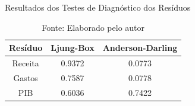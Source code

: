 \documentclass[a4paper, 12pt, openany, oneside, brazil]{abntex2}
\begin{document}
\begin{apendicesenv}
\begin{table}[h!]
	\centering
	\caption{Resultados dos Testes de Diagnóstico dos Resíduos}
	\begin{tabular}{|c|c|c|}
		\hline
		\textbf{Resíduo} & \textbf{Ljung-Box} & \textbf{Anderson-Darling} \\ \hline
		Receita & 0.9372 & 0.0773 \\ \hline
		Gastos  & 0.7587 & 0.0778 \\ \hline
		PIB     & 0.6036 & 0.7422 \\ \hline
	\end{tabular}
	\caption*{Fonte: Elaborado pelo autor}
\end{table}


\end{apendicesenv}




% 
% 
%



% 




\end{document}
